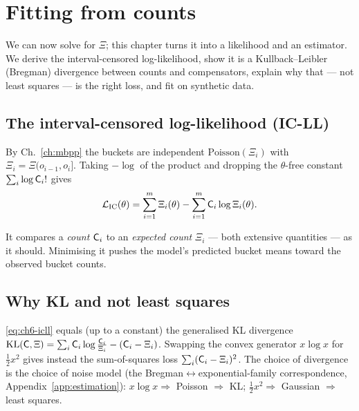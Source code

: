 \chapter{Fitting from counts}
\label{ch:fitting}

\begin{motivation}
We can now solve for $\Xi$; this chapter turns it into a likelihood and an
estimator. We derive the interval-censored log-likelihood, show it is a
Kullback--Leibler (Bregman) divergence between counts and compensators, explain why
that --- not least squares --- is the right loss, and fit on synthetic data.
\end{motivation}

\section{The interval-censored log-likelihood (IC-LL)}

By Ch.~\ref{ch:mbpp} the buckets are independent $\mathrm{Poisson}(\Xi_i)$ with
$\Xi_i=\Xi(o_{i-1},o_i]$. Taking $-\log$ of the product and dropping the
$\theta$-free constant $\sum_i\log\mathsf{C}_i!$ gives
\begin{equation}
\mathcal L_{\mathrm{IC}}(\theta)=\sum_{i=1}^m\Xi_i(\theta)-\sum_{i=1}^m\mathsf{C}_i\log\Xi_i(\theta).
\label{eq:ch6-icll}
\end{equation}

\begin{intuitionbox}
It compares a \emph{count} $\mathsf{C}_i$ to an \emph{expected count} $\Xi_i$ ---
both extensive quantities --- as it should. Minimising it pushes the model's
predicted bucket means toward the observed bucket counts.
\end{intuitionbox}

\section{Why KL and not least squares}

\eqref{eq:ch6-icll} equals (up to a constant) the generalised KL divergence
$\operatorname{KL}(\mathsf{C},\Xi)=\sum_i\mathsf{C}_i\log\frac{\mathsf{C}_i}{\Xi_i}-(\mathsf{C}_i-\Xi_i)$.
Swapping the convex generator $x\log x$ for $\tfrac12 x^2$ gives instead the
sum-of-squares loss $\sum_i(\mathsf{C}_i-\Xi_i)^2$. The choice of divergence is the
choice of noise model (the Bregman$\leftrightarrow$exponential-family
correspondence, Appendix~\ref{app:estimation}): $x\log x\Rightarrow$ Poisson
$\Rightarrow$ KL; $\tfrac12x^2\Rightarrow$ Gaussian $\Rightarrow$ least squares.

